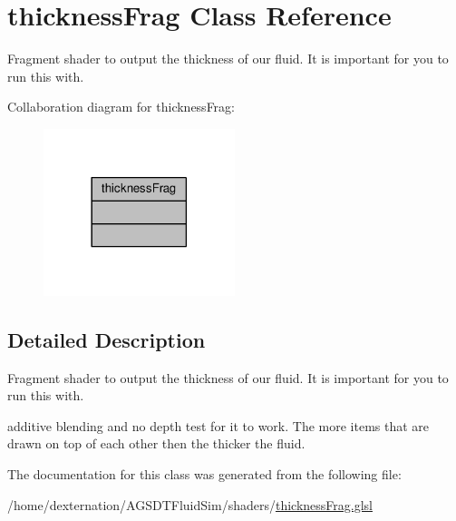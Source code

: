 \hypertarget{classthickness_frag}{\section{thickness\-Frag Class Reference}
\label{classthickness_frag}
}


Fragment shader to output the thickness of our fluid. It is important for you to run this with.  




Collaboration diagram for thickness\-Frag\-:\nopagebreak
\begin{figure}[H]
\begin{center}
\leavevmode
\includegraphics[width=158pt]{classthickness_frag__coll__graph}
\end{center}
\end{figure}


\subsection{Detailed Description}
Fragment shader to output the thickness of our fluid. It is important for you to run this with. 

additive blending and no depth test for it to work. The more items that are drawn on top of each other then the thicker the fluid. 

The documentation for this class was generated from the following file\-:\begin{DoxyCompactItemize}
\item 
/home/dexternation/\-A\-G\-S\-D\-T\-Fluid\-Sim/shaders/\hyperlink{thickness_frag_8glsl}{thickness\-Frag.\-glsl}\end{DoxyCompactItemize}
